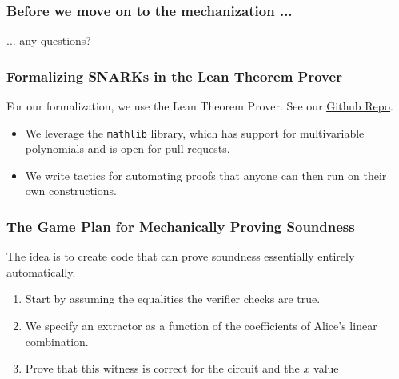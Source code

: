 \documentclass{beamer}
\begin{document}
\begin{frame}
    
    \frametitle{Before we move on to the mechanization ...}

    \begin{center}
        ... any questions?        
    \end{center}

    
    
\end{frame}



\begin{frame}
    \frametitle{Formalizing SNARKs in the Lean Theorem Prover}
    
    For our formalization, we use the Lean Theorem Prover. See our \underline{\href{https://github.com/BoltonBailey/formal_baby_snark}{Github Repo}}. %

    \begin{itemize}
        \item We leverage the \texttt{mathlib} library, which has support for multivariable polynomials and is open for pull requests. 
        \item We write tactics for automating proofs that anyone can then run on their own constructions.
    \end{itemize}


\end{frame}

\begin{frame}
    
    \frametitle{The Game Plan for Mechanically Proving Soundness}

    The idea is to create code that can prove soundness essentially entirely automatically.

    \begin{enumerate}
        \item Start by assuming the equalities the verifier checks are true.
        \item We specify an extractor as a function of the coefficients of Alice's linear combination.
        \item Prove that this witness is correct for the circuit and the $x$ value
    \end{enumerate}
    
\end{frame}
\end{document}
